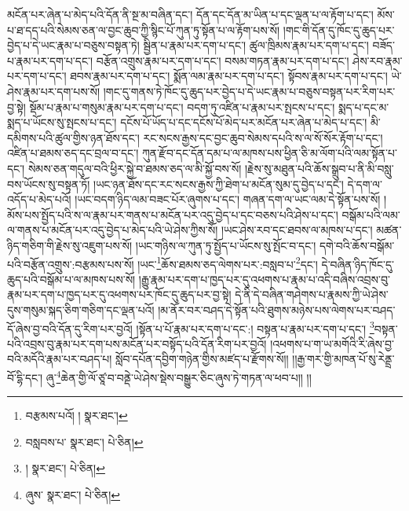 མངོན་པར་ཞེན་པ་མེད་པའི་དོན་ནི་སྔ་མ་བཞིན་དང་། དོན་དང་དོན་མ་ཡིན་པ་དང་ལྡན་པ་ལ་རྟོག་པ་དང་། མོས་པ་ཐ་དད་པའི་སེམས་ཅན་ལ་བྱང་ཆུབ་ཀྱི་སྙིང་པོ་ཀུན་ཏུ་སྟོན་པ་ལ་རྟོག་པས་སོ། །གང་གི་དོན་དུ་ཁོང་དུ་ཆུད་པར་བྱེད་པ་དེ་ཡང་རྣམ་པ་བཅུས་བསྟན་ཏེ། སྦྱིན་པ་རྣམ་པར་དག་པ་དང་། ཚུལ་ཁྲིམས་རྣམ་པར་དག་པ་དང་། བཟོད་པ་རྣམ་པར་དག་པ་དང་། བརྩོན་འགྲུས་རྣམ་པར་དག་པ་དང་། བསམ་གཏན་རྣམ་པར་དག་པ་དང་། ཤེས་རབ་རྣམ་པར་དག་པ་དང་། ཐབས་རྣམ་པར་དག་པ་དང་། སྨོན་ལམ་རྣམ་པར་དག་པ་དང་། སྟོབས་རྣམ་པར་དག་པ་དང་། ཡེ་ཤེས་རྣམ་པར་དག་པས་སོ། །གང་དུ་གནས་ཏེ་ཁོང་དུ་ཆུད་པར་བྱེད་པ་དེ་ཡང་རྣམ་པ་བཅུས་བསྟན་པར་རིག་པར་བྱ་སྟེ། སྡོམ་པ་རྣམ་པ་གསུམ་རྣམ་པར་དག་པ་དང་། བདག་ཏུ་འཛིན་པ་རྣམ་པར་སྤངས་པ་དང་། སྨད་པ་དང་མ་སྨད་པ་ཡོངས་སུ་སྤངས་པ་དང་། དངོས་པོ་ཡོད་པ་དང་དངོས་པོ་མེད་པར་མངོན་པར་ཞེན་པ་མེད་པ་དང་། མི་དམིགས་པའི་ཚུལ་གྱིས་ཉན་ཐོས་དང་། རང་སངས་རྒྱས་དང་བྱང་ཆུབ་སེམས་དཔའི་ས་ལ་སོ་སོར་རྟོག་པ་དང་། འཛིན་པ་ཐམས་ཅད་དང་བྲལ་བ་དང་། ཀུན་རྫོབ་དང་དོན་དམ་པ་ལ་མཁས་པས་ཕྱིན་ཅི་མ་ལོག་པའི་ལམ་སྟོན་པ་དང་། སེམས་ཅན་གདུལ་བའི་ཕྱིར་སྐྱེ་བ་ཐམས་ཅད་ལ་མི་སྐྱོ་བས་སོ། །རྗེས་སུ་མཐུན་པའི་ཆོས་སྒྲུབ་པ་ནི་མི་བསླུ་བས་ཡོངས་སུ་བསྟན་ཏོ། །ཡང་ཉན་ཐོས་དང་རང་སངས་རྒྱས་ཀྱི་ཐེག་པ་མངོན་སུམ་དུ་བྱེད་པ་དང་། དེ་དག་ལ་འདོད་པ་མེད་པའོ། །ཡང་བདག་ཉིད་ལམ་བཟང་པོར་ཞུགས་པ་དང་། གཞན་དག་ལ་ཡང་ལམ་དེ་སྟོན་པས་སོ། །མོས་པས་སྤྱོད་པའི་ས་ལ་རྣམ་པར་གནས་པ་མངོན་པར་འདུ་བྱེད་པ་དང་བཅས་པའི་ཤེས་པ་དང་། བསྒོམ་པའི་ལམ་ལ་གནས་པ་མངོན་པར་འདུ་བྱེད་པ་མེད་པའི་ཡེ་ཤེས་ཀྱིས་སོ། །ཡང་ཤེས་རབ་དང་ཐབས་ལ་མཁས་པ་དང་། མཚན་ཉིད་གཅིག་གི་རྗེས་སུ་འཇུག་པས་སོ། །ཡང་གཉིས་ལ་ཀུན་ཏུ་སྤྱོད་པ་ཡོངས་སུ་སྤོང་བ་དང་། དགེ་བའི་ཆོས་བསྒོམ་པའི་བརྩོན་འགྲུས་:བརྩམས་པས་སོ། །ཡང་\footnote{བརྩམས་པའོ། །  སྣར་ཐང་། }ཆོས་ཐམས་ཅད་ལེགས་པར་:བསླབ་པ་\footnote{བསླབས་པ་  སྣར་ཐང་།  པེ་ཅིན། }དང་། དེ་བཞིན་ཉིད་ཁོང་དུ་ཆུད་པའི་བསྒོམ་པ་ལ་མཁས་པས་སོ། །རྒྱུ་རྣམ་པར་དག་པ་ཁྱད་པར་དུ་འཕགས་པ་རྣམ་པ་འདི་བཞིས་འབྲས་བུ་རྣམ་པར་དག་པ་ཁྱད་པར་དུ་འཕགས་པར་ཁོང་དུ་ཆུད་པར་བྱ་སྟེ། དེ་ནི་དེ་བཞིན་གཤེགས་པ་རྣམས་ཀྱི་ཡེ་ཤེས་དུས་གསུམ་སྐད་ཅིག་གཅིག་དང་ལྡན་པའོ། །མ་ནོར་བར་བཤད་དེ་སྟོན་པའི་ཐུགས་མཉེས་པས་ལེགས་པར་བཤད་དོ་ཞེས་བྱ་བའི་དོན་དུ་རིག་པར་བྱའོ། །སྟོན་པ་པོ་རྣམ་པར་དག་པ་དང་:། བསྟན་པ་རྣམ་པར་དག་པ་དང་། \footnote{།    སྣར་ཐང་།  པེ་ཅིན། }བསྟན་པའི་འབྲས་བུ་རྣམ་པར་དག་པས་མངོན་པར་བསྟོད་པའི་དོན་རིག་པར་བྱའོ། །འཕགས་པ་ག་ཡ་མགོའི་རི་ཞེས་བྱ་བའི་མདོའི་རྣམ་པར་བཤད་པ། སློབ་དཔོན་དབྱིག་གཉེན་གྱིས་མཛད་པ་རྫོགས་སོ།། །།རྒྱ་གར་གྱི་མཁན་པོ་སུ་རེནྡྲ་བོ་དྷི་དང་། ཞུ་\footnote{ཞུས་  སྣར་ཐང་།  པེ་ཅིན། }ཆེན་གྱི་ལོ་ཙཱ་བ་བནྡེ་ཡེ་ཤེས་སྡེས་བསྒྱུར་ཅིང་ཞུས་ཏེ་གཏན་ལ་ཕབ་པ།། །།